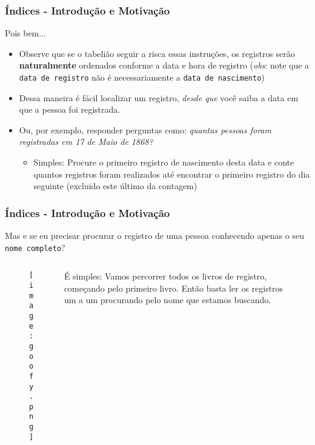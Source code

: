 \documentclass[t, 10pt, aspectratio=169, table, x11names]{beamer}
\begin{document}
	\begin{frame}
		\frametitle{Índices - Introdução e Motivação}

		Pois bem...
		
		\begin{itemize}
			\item Observe que se o tabelião seguir a risca essas instruções, os registros serão \textbf{naturalmente} ordenados conforme a data e hora de registro (\textit{obs}: note que a \texttt{data de registro} não é necessariamente a \texttt{data de nascimento})
			\bigskip
			\item Dessa maneira é fácil localizar um registro, \textit{desde que} você saiba a data em que a pessoa foi registrada.
			\bigskip
			\item Ou, por exemplo, responder perguntas como: \textit{quantas pessoas foram registradas em 17 de Maio de 1868?}
			\begin{itemize}
				\item Simples: Procure o primeiro registro de nascimento desta data e conte quantos registros foram realizados até encontrar o primeiro registro do dia seguinte (excluido este último da contagem)
			\end{itemize}
		\end{itemize}
	\end{frame}

	\begin{frame}
		\frametitle{Índices - Introdução e Motivação}
		Mas e se eu precisar procurar o registro de uma pessoa conhecendo apenas o seu \texttt{nome completo}?
		\bigskip
		\begin{columns}[t]
			\begin{column}{0.40\textwidth}
				\begin{figure}[h]
					\texttt{[image: goofy.png]}
				\end{figure}
			\end{column}
			\begin{column}{0.50\textwidth}
				\bigskip
				
				É simples: Vamos percorrer todos os livros de registro, começando pelo primeiro livro. Então basta ler os registros um a um procurando pelo nome que estamos buscando.
			\end{column}
			\begin{column}{0.05\textwidth}
			\end{column}
		\end{columns}
	\end{frame}
\end{document}

